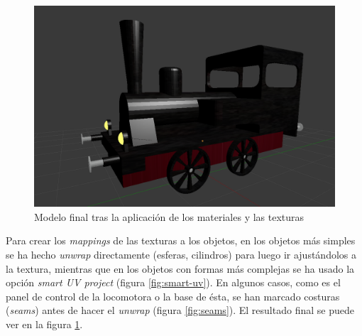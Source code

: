 \documentclass{article}
\begin{document}
\begin{figure}
    \includegraphics[width=\textwidth]{images/final.png}
    \caption{Modelo final tras la aplicación de los materiales y las texturas}
    \label{fig:final}
\end{figure}

Para crear los \textit{mappings} de las texturas a los objetos, en los objetos
más simples se ha hecho \textit{unwrap} directamente (esferas, cilindros) para
luego ir ajustándolos a la textura, mientras que en los objetos con formas más
complejas se ha usado la opción \textit{smart UV project} (figura
\ref{fig:smart-uv}). En algunos casos, como es el panel de control de la
locomotora o la base de ésta, se han marcado costuras (\textit{seams}) antes de
hacer el \textit{unwrap} (figura \ref{fig:seams}). El resultado final se puede
ver en la figura \ref{fig:final}.
\end{document}
